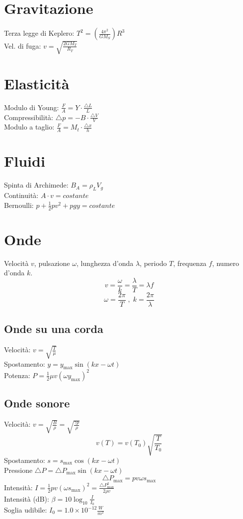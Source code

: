 \documentclass{article}
\begin{document}
\begin{small}
\begin{multicols}{3}
\section{Gravitazione}
		Terza legge di Keplero: $ T^2 = ( \frac{ 4 \pi^2 }{ GM_S } ) R^3 $ \\
		Vel. di fuga: $ v = \sqrt{ \frac{ 2 GM_T }{ R_T } } $
\section{Elasticità}
		Modulo di Young: $ \frac{ F }{ A } = Y \cdot \frac{ \triangle L }{ L } $ \\
		Compressibilità: $ \triangle p = - B \cdot \frac{ \triangle V }{ V } $ \\
		Modulo a taglio: $ \frac{ F }{ A } = M_t \cdot \frac{ \triangle x }{ h } $
\section{Fluidi}
		Spinta di Archimede: $ B_A = \rho_L V_g $ \\
		Continuità: $ A \cdot v = costante $ \\
		Bernoulli: $ p + \frac{1}{2} p v^2 + p g y = costante $
\section{Onde}
		Velocità $v$, pulsazione $\omega$, lunghezza d'onda $\lambda$, periodo $T$, frequenza $f$, numero d'onda $k$.
		\[ v = \frac{ \omega }{ k } = \frac{ \lambda }{ T } = \lambda f \]
		\[ \omega = \frac{ 2 \pi }{ T } \;,\; k = \frac{ 2 \pi }{ \lambda } \]
	\subsection{Onde su una corda}
		Velocità: $ v = \sqrt{ \frac{ T }{ \mu } } $ \\
		Spostamento: $ y = y_{\max} \sin ( k x - \omega t ) $ \\
		Potenza: $ P = \frac{1}{2} \mu v ( \omega y_{\max} )^2 $
	\subsection{Onde sonore}
		Velocità: $ v = \sqrt{ \frac{ B }{ \rho } } = \sqrt{ \frac{ \gamma p }{ \rho } } $
		\[ v ( T ) = v ( T_0 ) \sqrt{ \frac{ T }{ T_0 } } \]
		Spostamento: $ s = s_{\max} \cos ( k x - \omega t ) $ \\
		Pressione $ \triangle P = \triangle P_{\max} \sin ( k x - \omega t ) $
		\[ \triangle P_{\max} = p v \omega s_{\max} \]
		Intensità: $ I = \frac{1}{2} p v ( \omega s_{\max} )^2 = \frac{ \triangle P_{\max}^2 }{ 2 \rho v } $ \\
		Intensità (dB): $ \beta = 10 \log_{10} \frac{ I }{ I_0 } $ \\
		Soglia udibile: $ I_0 = 1.0 \times 10^{-12} \frac{ W }{ m^2 } $

\end{multicols}
\end{small}
\end{document}
